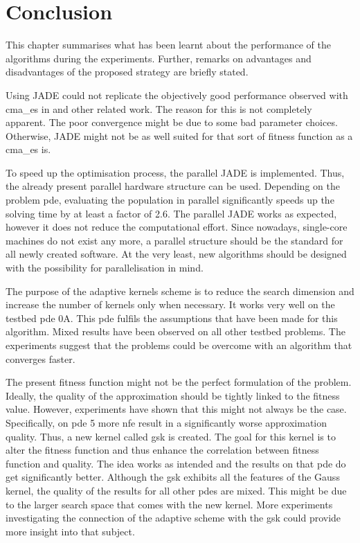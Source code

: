 \documentclass[./\jobname.tex]{subfiles}
\begin{document}
\chapter{Conclusion}
This chapter summarises what has been learnt about the performance of the algorithms during the experiments. Further, remarks on advantages and disadvantages of the proposed strategy are briefly stated. 

Using JADE could not replicate the objectively good performance observed with \gls{cma_es} in \cite{chaquet_using_2019} and other related work. The reason for this is not completely apparent. The poor convergence might be due to some bad parameter choices. Otherwise, JADE might not be as well suited for that sort of fitness function as a \gls{cma_es} is. 

To speed up the optimisation process, the parallel JADE is implemented. Thus, the already present parallel hardware structure can be used. Depending on the problem \gls{pde}, evaluating the population in parallel significantly speeds up the solving time by at least a factor of 2.6. The parallel JADE works as expected, however it does not reduce the computational effort. Since nowadays, single-core machines do not exist any more, a parallel structure should be the standard for all newly created software. At the very least, new algorithms should be designed with the possibility for parallelisation in mind. 

The purpose of the adaptive kernels scheme is to reduce the search dimension and increase the number of kernels only when necessary. It works very well on the testbed \gls{pde} 0A. This \gls{pde} fulfils the assumptions that have been made for this algorithm. Mixed results have been observed on all other testbed problems. The experiments suggest that the problems could be overcome with an algorithm that converges faster. 

The present fitness function might not be the perfect formulation of the problem. Ideally, the quality of the approximation should be tightly linked to the fitness value. However, experiments have shown that this might not always be the case. Specifically, on \gls{pde} 5 more \gls{nfe} result in a significantly worse approximation quality. Thus, a new kernel called \gls{gsk} is created. The goal for this kernel is to alter the fitness function and thus enhance the correlation between fitness function and quality. The idea works as intended and the results on that \gls{pde} do get significantly better. Although the \gls{gsk} exhibits all the features of the Gauss kernel, the quality of the results for all other \gls{pde}s are mixed. This might be due to the larger search space that comes with the new kernel. More experiments investigating the connection of the adaptive scheme with the \gls{gsk} could provide more insight into that subject.
\end{document}
